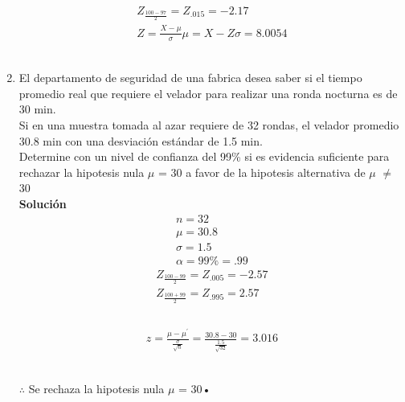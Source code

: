 \documentclass[11pt,a4paper]{article}
\begin{document}
\begin{enumerate}
	\begin{gather*}	 
	 Z_{\frac{100 - 97}{2}} = Z_{.015} = -2.17\\
	 Z = \frac{X -\mu}{\sigma}
	 \mu = X - Z\sigma = 8.0054
	\end{gather*}\\
\item El departamento de seguridad de una fabrica desea saber si el tiempo promedio real que requiere el velador para realizar una ronda nocturna es de 30 min.\\
Si en una muestra tomada al azar requiere de 32 rondas, el velador promedio 30.8 min con una desviación estándar de 1.5 min.\\
Determine con un nivel de confianza del 99\% si es evidencia suficiente para rechazar la hipotesis nula $\mu$ = 30 a favor de la hipotesis alternativa de $\mu$ $\neq$ 30
	\\\textbf{Solución}
	\begin{gather*}
		 n	= 32\\
		 \mu = 30.8\\
		 \sigma = 1.5\\
		 \alpha = 99\% = .99
	\end{gather*}
	\begin{gather*}	 
	 Z_{\frac{100 - 99}{2}} = Z_{.005} = -2.57\\
	 Z_{\frac{100 + 99}{2}} = Z_{.995} = 2.57\\
	\end{gather*}\\
	\begin{gather*}	 
	 z = \frac{\mu - \mu^{'}}{\frac{\sigma}{\sqrt{n}}} = \frac{30.8 - 30}{\frac{1.5}{\sqrt{32}}} = 3.016
	\end{gather*}\\
	\begin{center}
	$\therefore$ Se rechaza la hipotesis nula $\mu$ = 30•
	\end{center}
	 

\end{enumerate}
\end{document}

